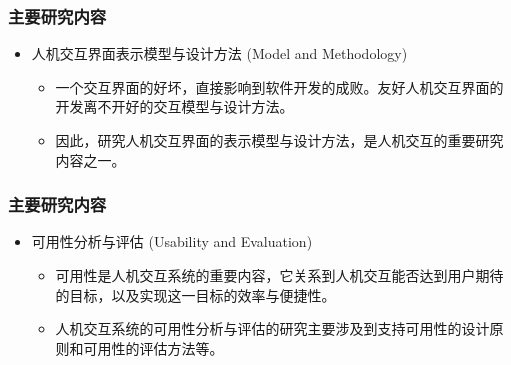 \documentclass{beamer}
\begin{document}
\begin{frame}
	\frametitle{主要研究内容}
	\begin{itemize}
		\item 人机交互界面表示模型与设计方法 (Model and Methodology)
		\begin{itemize}
			\item 一个交互界面的好坏，直接影响到软件开发的成败。友好人机交互界面的开发离不开好的交互模型与设计方法。
			\item 因此，研究人机交互界面的表示模型与设计方法，是人机交互的重要研究内容之一。
		\end{itemize}
	\end{itemize}
\end{frame}

\begin{frame}
	\frametitle{主要研究内容}
	\begin{itemize}
		\item 可用性分析与评估 (Usability and Evaluation)
		\begin{itemize}
			\item 可用性是人机交互系统的重要内容，它关系到人机交互能否达到用户期待的目标，以及实现这一目标的效率与便捷性。
			\item 人机交互系统的可用性分析与评估的研究主要涉及到支持可用性的设计原则和可用性的评估方法等。
		\end{itemize}
	\end{itemize}
\end{frame}
\end{document}
